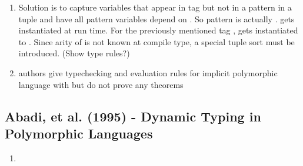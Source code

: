 \documentclass[12pt]{article}	%
\begin{document}
\begin{enumerate}
	\item Solution is to capture variables that appear in tag but not in a pattern in a tuple  and have all pattern variables depend on . So pattern  is actually  .  gets instantiated at run time. For the previously mentioned tag ,  gets instantiated to . Since arity of  is not known at compile type, a special tuple sort must be introduced. (Show type rules?)
	\item authors give typechecking and evaluation rules for implicit polymorphic language with \Dynamic but do not prove any theorems
	
	
\end{enumerate}

\subsection*{Abadi, et al. (1995) - Dynamic Typing in Polymorphic Languages}
\begin{enumerate}
	\item
\end{enumerate}




\end{document}
